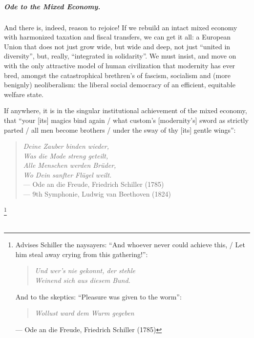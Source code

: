 \documentclass[11pt,a4paper,oneside]{article}
\begin{document}
\paragraph{Ode to the Mixed Economy.} And there is, indeed, reason to rejoice! If we rebuild an intact mixed economy with harmonized taxation and fiscal transfers, we can get it all: 
a European Union that does not just grow wide, but wide and deep, not just ``united in diversity'', but, really, ``integrated in solidarity''. 
We must insist, and move on with the only attractive model of human civilization that modernity has ever bred, amongst the catastrophical brethren's of fascism, socialism and (more benignly) neoliberalism: 
the liberal social democracy of an efficient, equitable welfare state.

If anywhere, it is in the singular institutional achievement of the mixed economy, that ``your [its] magics bind again / what custom's [modernity's] sword as strictly parted / all men become brothers / under the sway of thy [its] gentle wings'':
\begin{verse}
	\emph{Deine Zauber binden wieder,}\\
	\emph{Was die Mode streng geteilt,}\\
	\emph{Alle Menschen werden Br\"{u}der,}\\
	\emph{Wo Dein sanfter Fl\"{u}gel weilt.}\\
	--- Ode an die Freude, Friedrich Schiller (1785)\\
	--- 9th Symphonie, Ludwig van Beethoven (1824)
\end{verse}

\footnote{
	Advises Schiller the naysayers: 
	``And whoever never could achieve this, / Let him steal away crying from this gathering!'':
	\begin{verse}
		\emph{Und wer's nie gekonnt, der stehle}\\
		\emph{Weinend sich aus diesem Bund.}\\
	\end{verse}
	And to the skeptics: 
	``Pleasure was given to the worm'':
	\begin{verse}
		\emph{Wollust ward dem Wurm gegeben}
	\end{verse}
	--- Ode an die Freude, Friedrich Schiller (1785) 
}

\pagebreak

\appendix
\chapter{\appendixname}

\glsaddall
\renewcommand*{\glspostdescription}{}
\printglossaries

\pagebreak

\end{document}
